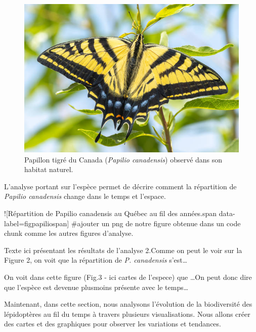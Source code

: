\documentclass[9pt,twocolumn,twoside,]{pnas-new}
\begin{document}
\begin{figure}
\centering
\includegraphics{Papilio_canadensis.png}
\caption{Papillon tigré du Canada (\emph{Papilio canadensis}) observé
dans son habitat naturel.}
\end{figure}

L'analyse portant sur l'espèce permet de décrire comment la répartition
de \emph{Papilio canadensis} change dans le temps et l'espace.

!{[}Répartition de Papilio canadensis au Québec au fil des années.span
data-label=figpapiliospan{]} \#ajouter un png de notre figure obtenue
dans un code chunk comme les autres figures d'analyse.

Texte ici présentant les résultats de l'analyse 2.Comme on peut le voir
sur la Figure 2, on voit que la répartition de \emph{P. canadensis}
s'est\ldots{}

On voit dans cette figure (Fig.3 - ici cartes de l'espece) que \ldots On
peut donc dire que l'espèce est devenue plusmoins présente avec le
temps\ldots{}

Maintenant, dans cette section, nous analysons l'évolution de la
biodiversité des lépidoptères au fil du temps à travers plusieurs
visualisations. Nous allons créer des cartes et des graphiques pour
observer les variations et tendances.
\end{document}
